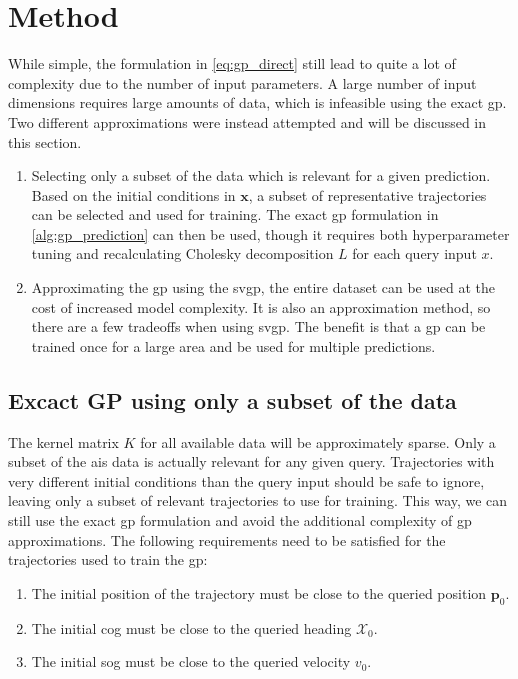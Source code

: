 \section{Method}
While simple, the formulation in \cref{eq:gp_direct} still lead to quite a lot of complexity due to the number of input parameters. A large number of input dimensions requires large amounts of data, which is infeasible using the exact \acrshort{gp}. Two different approximations were instead attempted and will be discussed in this section.

\begin{enumerate}
    \item Selecting only a subset of the data which is relevant for a given prediction. Based on the initial conditions in $\boldsymbol{x}$, a subset of representative trajectories can be selected and used for training. The exact \acrshort{gp} formulation in \cref{alg:gp_prediction} can then be used, though it requires both hyperparameter tuning and recalculating Cholesky decomposition $L$ for each query input $x$.
    \item Approximating the \acrshort{gp} using the \acrshort{svgp}, the entire dataset can be used at the cost of increased model complexity. It is also an approximation method, so there are a few tradeoffs when using \acrshort{svgp}. The benefit is that a \acrshort{gp} can be trained once for a large area and be used for multiple predictions.
\end{enumerate}

\subsection{Excact GP using only a subset of the data}
The kernel matrix $K$ for all available data will be approximately sparse. Only a subset of the \acrshort{ais} data is actually relevant for any given query. Trajectories with very different initial conditions than the query input should be safe to ignore, leaving only a subset of relevant trajectories to use for training. This way, we can still use the exact \acrshort{gp} formulation and avoid the additional complexity of \acrshort{gp} approximations. The following requirements need to be satisfied for the trajectories used to train the \acrshort{gp}:
\begin{enumerate}
    \item The initial position of the trajectory must be close to the queried position $\boldsymbol{p}_0$.
    \item The initial \acrshort{cog} must be close to the queried heading $\mathcal{X}_0$.
    \item The initial \acrshort{sog} must be close to the queried velocity $v_0$.
\end{enumerate} 


